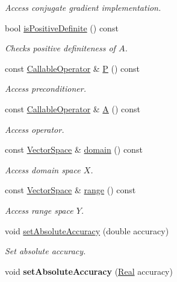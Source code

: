 \begin{DoxyCompactItemize}
\begin{DoxyCompactList}\small\item\em Access conjugate gradient implementation. \end{DoxyCompactList}\item 
bool \hyperlink{classSpacy_1_1CG_1_1LinearSolver_adec5404c595dc514a9c81c9ccc06cf41_adec5404c595dc514a9c81c9ccc06cf41}{is\+Positive\+Definite} () const 
\begin{DoxyCompactList}\small\item\em Checks positive definiteness of $A$. \end{DoxyCompactList}\item 
const \hyperlink{group__SpacyGroup_ga2b74020d806ad800795cdd97dab3466f_ga2b74020d806ad800795cdd97dab3466f}{Callable\+Operator} \& \hyperlink{classSpacy_1_1CG_1_1LinearSolver_aeb4edca3af6d08fcb7700664c2058512_aeb4edca3af6d08fcb7700664c2058512}{P} () const 
\begin{DoxyCompactList}\small\item\em Access preconditioner. \end{DoxyCompactList}\item 
const \hyperlink{group__SpacyGroup_ga2b74020d806ad800795cdd97dab3466f_ga2b74020d806ad800795cdd97dab3466f}{Callable\+Operator} \& \hyperlink{classSpacy_1_1CG_1_1LinearSolver_aed4f6379ad3972bd765830ea57e05135_aed4f6379ad3972bd765830ea57e05135}{A} () const 
\begin{DoxyCompactList}\small\item\em Access operator. \end{DoxyCompactList}\item 
const \hyperlink{classSpacy_1_1VectorSpace}{Vector\+Space} \& \hyperlink{classSpacy_1_1OperatorBase_a2588f9b3e0188820c4c494e63293dc6f_a2588f9b3e0188820c4c494e63293dc6f}{domain} () const 
\begin{DoxyCompactList}\small\item\em Access domain space $X$. \end{DoxyCompactList}\item 
const \hyperlink{classSpacy_1_1VectorSpace}{Vector\+Space} \& \hyperlink{classSpacy_1_1OperatorBase_ab19d3b7a6f290b1079248f1e567e53d6_ab19d3b7a6f290b1079248f1e567e53d6}{range} () const 
\begin{DoxyCompactList}\small\item\em Access range space $Y$. \end{DoxyCompactList}\item 
void \hyperlink{classSpacy_1_1Mixin_1_1AbsoluteAccuracy_a71cfcdc0c504be63c18c3e78df157738_a71cfcdc0c504be63c18c3e78df157738}{set\+Absolute\+Accuracy} (double accuracy)
\begin{DoxyCompactList}\small\item\em Set absolute accuracy. \end{DoxyCompactList}\item 
\hypertarget{classSpacy_1_1Mixin_1_1AbsoluteAccuracy_ad099a4a0a770133b56acaaf8783d4ba6}{}void {\bfseries set\+Absolute\+Accuracy} (\hyperlink{classSpacy_1_1Real}{Real} accuracy)\label{classSpacy_1_1Mixin_1_1AbsoluteAccuracy_ad099a4a0a770133b56acaaf8783d4ba6}


\end{DoxyCompactItemize}
